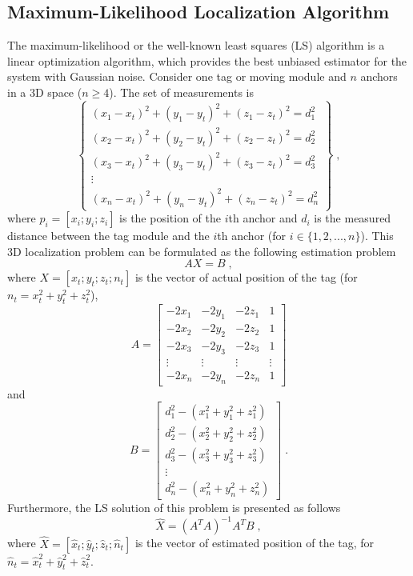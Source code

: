 \documentclass{article}
\begin{document}
\subsection{Maximum-Likelihood Localization Algorithm}
The maximum-likelihood or the well-known least squares (LS) algorithm is a linear optimization algorithm, which provides the best unbiased estimator for the system with Gaussian noise. 
Consider one tag or moving module and $n$ anchors in a 3D space ($n \geq 4$). The set of measurements is
\begin{equation} \label{Eq_03_01}
\left\{
\begin{matrix}
(x_1 - x_t)^2 + (y_1 - y_t)^2 + (z_1 - z_t)^2 = d_1^2 \\
(x_2 - x_t)^2 + (y_2 - y_t)^2 + (z_2 - z_t)^2 = d_2^2 \\
(x_3 - x_t)^2 + (y_3 - y_t)^2 + (z_3 - z_t)^2 = d_3^2 \\
\vdots \\
(x_n - x_t)^2 + (y_n - y_t)^2 + (z_n - z_t)^2 = d_n^2
\end{matrix}
\right\} \;,
\end{equation}
where $p_i = [x_i;y_i;z_i]$ is the position of the $i$th anchor and $d_i$ is the measured distance between the tag module and the $i$th anchor (for $i \in \{1,2,...,n\}$).
This 3D localization problem can be formulated as the following estimation problem  
\begin{equation} \label{Eq_03_02}
A X = B \;,
\end{equation}
where $X = [x_t;y_t;z_t;n_t]$ is the vector of actual position of the tag (for $n_t = x_t^2 + y_t^2 + z_t^2$),
\begin{equation} \label{Eq_03_03}
A = \left[\begin{matrix}
-2x_1 & -2y_1 & -2z_1 & 1 \\
-2x_2 & -2y_2 & -2z_2 & 1 \\
-2x_3 & -2y_3 & -2z_3 & 1 \\
\vdots & \vdots & \vdots & \vdots \\
-2x_n & -2y_n & -2z_n & 1
\end{matrix}\right]
\end{equation}
and
\begin{equation} \label{Eq_03_04}
B = \left[\begin{matrix}
d_1^2 - (x_1^2 + y_1^2 + z_1^2) \\
d_2^2 - (x_2^2 + y_2^2 + z_2^2) \\
d_3^2 - (x_3^2 + y_3^2 + z_3^2) \\
\vdots \\
d_n^2 - (x_n^2 + y_n^2 + z_n^2)
\end{matrix}\right] \;.
\end{equation}
Furthermore, the LS solution of this problem is presented as follows
\begin{equation} \label{Eq_03_05}
\hat{X} = (A^T A)^{-1} A^T B \;,
\end{equation}
where $\hat{X}=[\hat{x}_t;\hat{y}_t;\hat{z}_t;\hat{n}_t]$ is the vector of estimated position of the tag, for $\hat{n}_t = \hat{x}_t^2 + \hat{y}_t^2 + \hat{z}_t^2$. \\
\end{document}
